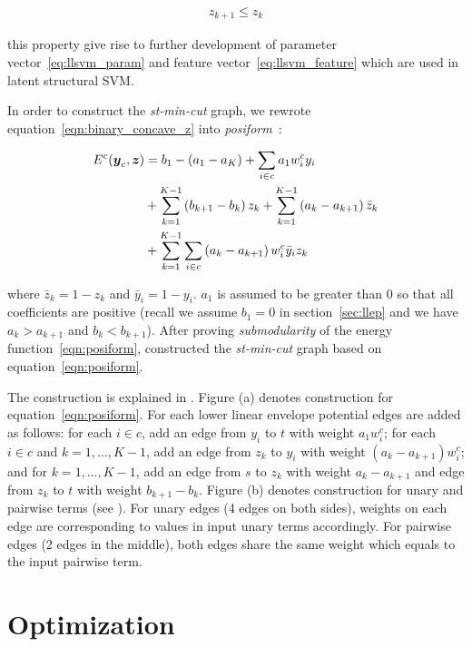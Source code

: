 \documentclass[sigconf, anonymous, review]{acmart}
\renewcommand{\citename}{\citet}
\renewcommand{\cite}{\citep}
\begin{document}
\begin{align}
  \label{eq:z_consecutive_constraint}
  z_{k+1} \leq z_k
\end{align}

\noindent this property give rise to further development of
parameter vector~\eqref{eq:llsvm_param} and feature
vector~\eqref{eq:llsvm_feature} which are used in latent
structural SVM.

In order to construct the \emph{st-min-cut} graph, we rewrote
equation~\eqref{eqn:binary_concave_z} into
\emph{posiform}~\cite{Boros:MATH02}:

\begin{align}
  \label{eqn:posiform}  
  E^c({\boldsymbol{y}}_c, {\boldsymbol{z}})
  &= b_1 - (a_1 - a_K) + \sum_{i \in c} a_1 w^c_i y_i \notag\\
  & + \sum_{k = 1}^{K - 1} \left( b_{k+1} - b_k \right) z_k
    + \sum_{k = 1}^{K - 1} \left( a_k - a_{k+1} \right)
    \bar{z}_k\notag\\
  & + \sum_{k = 1}^{K - 1} \sum_{i \in c} \left( a_k - a_{k+1}
    \right) w^c_i \bar{y}_i z_k
\end{align}

\noindent where $\bar{z}_k = 1 - z_k$ and $\bar{y}_i = 1 - y_i$.
$a_1$ is assumed to be greater than $0$ so that all coefficients
are positive (recall we assume $b_1=0$ in section~\ref{sec:llep}
and we have $a_k > a_{k+1}$ and $b_k < b_{k+1}$). After proving
\emph{submodularity} of the energy function~\eqref{eqn:posiform},
\citename{gouldlearning} constructed the \emph{st-min-cut} graph
based on equation~\eqref{eqn:posiform}.

The construction is explained in . Figure
(a) denotes construction for equation~\eqref{eqn:posiform}. For
each lower linear envelope potential edges are added as follows:
for each $i \in c$, add an edge from $y_i$ to $t$ with weight
$a_1 w^c_i$; for each $i \in c$ and $k = 1, \ldots, K-1$, add an
edge from $z_k$ to $y_i$ with weight $(a_{k} - a_{k+1}) w^c_i$;
and for $k = 1, \ldots, K-1$, add an edge from $s$ to $z_k$ with
weight $a_k - a_{k+1}$ and edge from $z_k$ to $t$ with weight
$b_{k+1} - b_k$. Figure (b) denotes construction for unary and
pairwise terms (see \cite{Kolmogorov:PAMI04}). For unary edges (4
edges on both sides), weights on each edge are corresponding to
values in input unary terms accordingly. For pairwise edges (2
edges in the middle), both edges share the same weight which
equals to the input pairwise term.

\section{Optimization}
\label{sec:opt}
\end{document}
